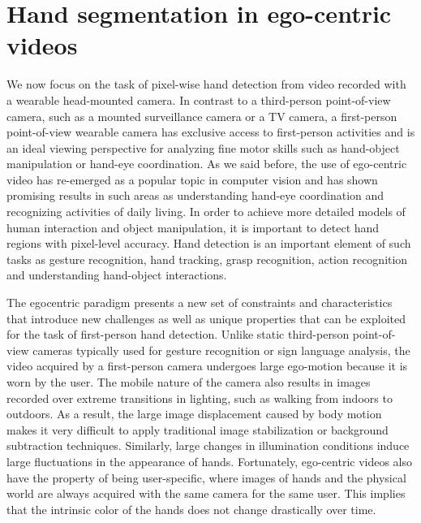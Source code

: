 
\chapter{Hand segmentation in ego-centric videos}


We now focus on the task of pixel-wise hand detection
from video recorded with a wearable head-mounted
camera. In contrast to a third-person point-of-view camera,
such as a mounted surveillance camera or a TV camera,
a first-person point-of-view wearable camera has exclusive
access to first-person activities and is an ideal viewing perspective
for analyzing fine motor skills such as hand-object
manipulation or hand-eye coordination. As we said before, the use of
ego-centric video has re-emerged as a popular topic in computer
vision and has shown promising results in such areas
as understanding hand-eye coordination and recognizing
activities of daily living. In order to achieve more
detailed models of human interaction and object manipulation,
it is important to detect hand regions with pixel-level
accuracy. Hand detection is an important element of such
tasks as gesture recognition, hand tracking, grasp recognition,
action recognition and understanding hand-object interactions.

The egocentric
paradigm presents a new set of constraints and characteristics
that introduce new challenges as well as unique
properties that can be exploited for the task of first-person
hand detection. Unlike static third-person point-of-view
cameras typically used for gesture recognition or sign language
analysis, the video acquired by a first-person camera
undergoes large ego-motion because it is worn by the
user. The mobile nature of the camera also results in images
recorded over extreme transitions in lighting, such as
walking from indoors to outdoors. As a result, the large image displacement caused by body motion makes it very difficult
to apply traditional image stabilization or background
subtraction techniques. Similarly, large changes in illumination
conditions induce large fluctuations in the appearance
of hands. Fortunately, ego-centric videos also have the
property of being user-specific, where images of hands and
the physical world are always acquired with the same camera
for the same user. This implies that the intrinsic color
of the hands does not change drastically over time.

